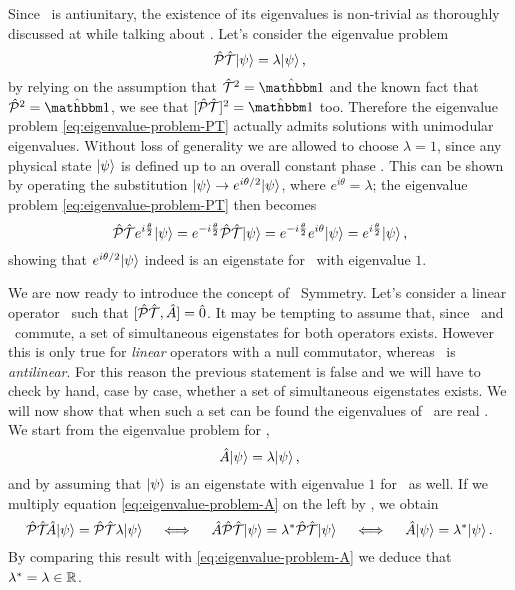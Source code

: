         Since \hPT\ is antiunitary, the existence of its eigenvalues is non-trivial as thoroughly discussed at  while talking about \hT. Let's consider the eigenvalue problem
        \begin{equation}
            \label{eq:eigenvalue-problem-PT}
            \mathcal{\hat{P}}\mathcal{\hat{T}}\! \ket{\psi} = \lambda\! \ket{\psi}
            \text{,}
        \end{equation}
        by relying on the assumption that $\hT^2 = \hidM$ and the known fact that $\hP^2 = \hidM$, we see that $\bqty*{\hPT}\!^2 = \togglehat{\idM}$ too. Therefore the eigenvalue problem \eqref{eq:eigenvalue-problem-PT} actually admits solutions with unimodular eigenvalues. Without loss of generality we are allowed to choose $\lambda = 1$, since any physical state $\ket{\psi}$ is defined up to an overall constant phase \cite{Bender2005}. This can be shown by operating the substitution $\ket{\psi} \rightarrow e^{i\theta / 2}\!\ket{\psi}$, where $e^{i\theta} = \lambda$; the eigenvalue problem \eqref{eq:eigenvalue-problem-PT} then becomes
        \begin{equation*}
            \mathcal{\hat{P}}\mathcal{\hat{T}} e^{i\frac{\theta}{2}}\! \ket{\psi}
            = e^{-i\frac{\theta}{2}} \mathcal{\hat{P}}\mathcal{\hat{T}}\! \ket{\psi}
            = e^{-i\frac{\theta}{2}} e^{i\theta}\! \ket{\psi}
            = e^{i\frac{\theta}{2}}\! \ket{\psi}
            \text{,}
        \end{equation*}
        showing that $e^{i\theta / 2}\! \ket{\psi}$ indeed is an eigenstate for \hPT\ with eigenvalue $1$.

        We are now ready to introduce the concept of \PT\ Symmetry. Let's consider a linear operator \hA\ such that $\comm*{\hPT}{\hA}\! = \hzero$. It may be tempting to assume that, since \hA\ and \hPT\ commute, a set of simultaneous eigenstates for both operators exists. However this is only true for \emph{linear} operators with a null commutator, whereas \hPT\ is \emph{antilinear}. For this reason the previous statement is false \cite{bender2024} and we will have to check by hand, case by case, whether a set of simultaneous eigenstates exists. We will now show that when such a set can be found the eigenvalues of \hA\ are real \cite{bender2024}. We start from the eigenvalue problem for \hA,
        \begin{equation}
            \label{eq:eigenvalue-problem-A}
            \hat{A}\! \ket{\psi} = \lambda\! \ket{\psi}
            \text{,}
        \end{equation}
        and by assuming that $\ket{\psi}$ is an eigenstate with eigenvalue $1$ for \hPT\ as well. If we multiply equation \eqref{eq:eigenvalue-problem-A} on the left by \hPT, we obtain
        \begin{equation*}
            \mathcal{\hat{P}}\mathcal{\hat{T}}\! \hat{A}\! \ket{\psi} = \mathcal{\hat{P}}\mathcal{\hat{T}} \lambda\! \ket{\psi}
            \quad\iff\quad
            \hat{A} \mathcal{\hat{P}}\mathcal{\hat{T}}\! \ket{\psi} = \lambda^* \mathcal{\hat{P}}\mathcal{\hat{T}}\! \ket{\psi}
            \quad\iff\quad
            \hat{A}\! \ket{\psi} = \lambda^*\! \ket{\psi}
            \text{.}
        \end{equation*}
        By comparing this result with \eqref{eq:eigenvalue-problem-A} we deduce that $\lambda^* = \lambda \in \mathbb{R}$.

